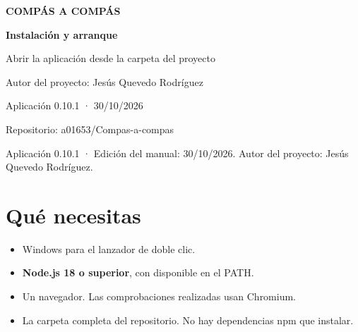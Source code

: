 \documentclass[a4paper,11pt]{article}
\let\originaltexttt\texttt
\renewcommand{\texttt}[1]{\originaltexttt{\seqsplit{#1}}}
\providecommand{\tightlist}{\setlength{\itemsep}{2pt}\setlength{\parskip}{0pt}}
\begin{document}
\begin{titlepage}
\thispagestyle{empty}
\pagecolor{navybg}
\color{white}
\vspace*{3cm}
\begin{center}
{\sffamily\bfseries\fontsize{16}{19}\selectfont\color{amber} COMPÁS A COMPÁS\par}
\vspace{1cm}
\par
\vspace{1.4cm}
{\sffamily\bfseries\fontsize{30}{38}\selectfont Instalación y arranque\par}
\vspace{0.8cm}
{\sffamily\fontsize{14}{20}\selectfont\color{lightblue} Abrir la aplicación desde la carpeta del proyecto\par}
\vfill
{\sffamily\small Autor del proyecto: Jesús Quevedo Rodríguez\par}
{\sffamily\small Aplicación 0.10.1 · 30/10/2026\par}
{\sffamily\small Repositorio: a01653/Compas-a-compas\par}
\vspace{2cm}
\end{center}
\end{titlepage}
\nopagecolor
\restoregeometry
\setcounter{page}{2}
\tableofcontents
\newpage
Aplicación 0.10.1 · Edición del manual: 30/10/2026. Autor del proyecto:
Jesús Quevedo Rodríguez.

\Needspace{3.5cm}
\section{Qué necesitas}\label{quuxe9-necesitas}

\begin{itemize}
\tightlist
\item
  Windows para el lanzador de doble clic.
\item
  \textbf{Node.js 18 o superior}, con \texttt{node.exe} disponible en el
  PATH.
\item
  Un navegador. Las comprobaciones realizadas usan Chromium.
\item
  La carpeta completa del repositorio. No hay dependencias npm que
  instalar.
\end{itemize}
\end{document}
